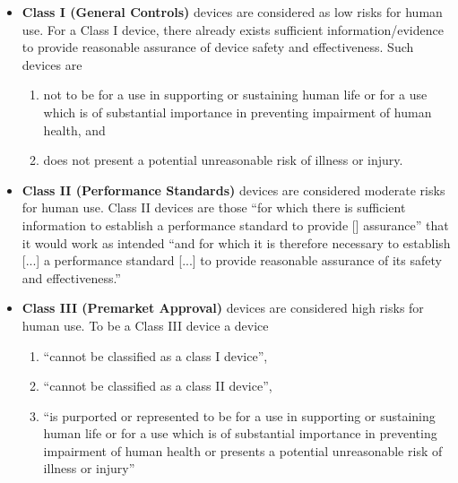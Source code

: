 \documentclass[11pt]{book}
\begin{document}
\begin{itemize}
	\item \textbf{Class I (General Controls)} devices are considered as low risks for human use. For a Class I device, there already exists sufficient information/evidence to provide reasonable assurance of device safety and effectiveness. Such devices are \begin{enumerate}
		\item not to be for a use in supporting or sustaining human life or for a use which is of substantial importance in preventing impairment of human health, and
		\item does not present a potential unreasonable risk of illness or injury.
	\end{enumerate}
	\item \textbf{Class II (Performance Standards)} devices are considered moderate risks for human use. Class II devices are those ``for which there is sufficient information to establish a performance standard to provide [] assurance'' that it would work as intended ``and for which it is therefore necessary to establish [...] a performance standard [...] to provide reasonable assurance of its safety and effectiveness.''
	\item \textbf{Class III (Premarket Approval) }devices are considered high risks for human use. To be a Class III device a device \begin{enumerate}
		\item ``cannot be classified as a class I device'',
		\item ``cannot be classified as a class II device'',
		\item ``is purported or represented to be for a use in supporting or sustaining human life or for a use which is of substantial importance in preventing impairment of human health or presents a potential unreasonable risk of illness or injury''
	\end{enumerate}
\end{itemize}
\end{document}

